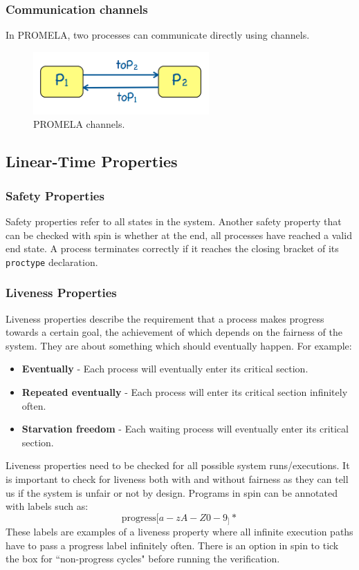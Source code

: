 \documentclass[11pt]{article}
\begin{document}
\subsubsection{Communication channels}  
In PROMELA, two processes can communicate directly using channels.
\begin{figure}[H]
\centering
\includegraphics[width=0.6\textwidth, keepaspectratio]{imgs/promela-channels.png}
\caption{PROMELA channels.}
\end{figure}

\subsection{Linear-Time Properties}
\subsubsection{Safety Properties}
Safety properties refer to all states in the system. 
\n
Another safety property that can be checked with spin is whether at the end, all processes have reached a valid end state. A process terminates correctly if it reaches the closing bracket of its \texttt{proctype} declaration. 
\subsubsection{Liveness Properties}
Liveness properties describe the requirement that a process makes progress towards a certain goal, the achievement of which depends on the fairness of the system.  They are about something which should eventually happen. For example:
\begin{itemize}
\item \textbf{Eventually} - Each process will eventually enter its critical section. 
\item \textbf{Repeated eventually} - Each process will enter its critical section infinitely often.
\item \textbf{Starvation freedom} - Each waiting process will eventually enter its critical section.
\end{itemize}
\noindent
Liveness properties need to be checked for all possible system runs/executions. It is important to check for liveness both with and without fairness as they can tell us if the system is unfair or not by design. 
\n
Programs in spin can be annotated with labels such as:
\begin{equation*}
\text{progress}[a-zA-Z0-9_]*
\end{equation*}
\noindent
These labels are examples of a liveness property where all infinite execution paths have to pass a progress label infinitely often. There is an option in spin to tick the box for ``non-progress cycles" before running the verification.
\end{document}
